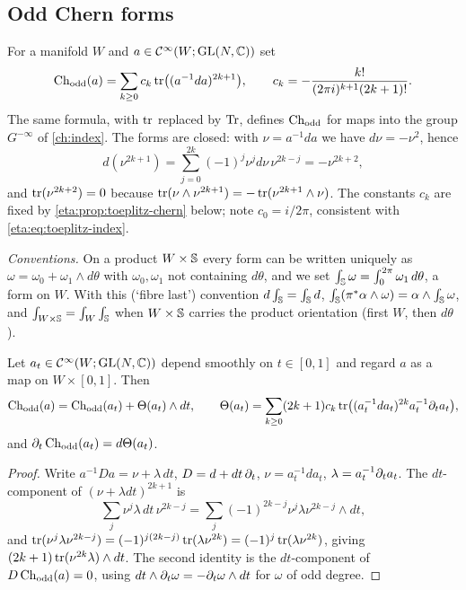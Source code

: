 \subsection{Odd Chern forms} For a manifold $W$ and $a\in\mathcal{C}^\infty(W;\operatorname{GL}(N,\mathbb{C}))$ set
\begin{equation}\label{eta:eq:chodd}
\operatorname{Ch}_{\mathrm{odd}}(a)=\sum_{k\ge0}c_k\operatorname{tr}\bigl((a^{-1}da)^{2k+1}\bigr),\qquad
c_k=-\frac{k!}{(2\pi i)^{k+1}(2k+1)!}.
\end{equation}
The same formula, with $\operatorname{tr}$ replaced by $\operatorname{Tr}$, defines $\operatorname{Ch}_{\mathrm{odd}}$ for maps into the
group $G^{-\infty}$ of \cref{ch:index}. The forms are closed: with
$\nu=a^{-1}da$ we have $d\nu=-\nu^2$, hence
\begin{equation}\label{eta:eq:d-power}
d(\nu^{2k+1})=\sum_{j=0}^{2k}(-1)^j\nu^jd\nu\,\nu^{2k-j}=-\nu^{2k+2},
\end{equation}
and $\operatorname{tr}(\nu^{2k+2})=0$ because $\operatorname{tr}(\nu\wedge\nu^{2k+1})=-\operatorname{tr}(\nu^{2k+1}\wedge\nu)$. The
constants $c_k$ are fixed by \cref{eta:prop:toeplitz-chern} below; note
$c_0=i/2\pi$, consistent with \eqref{eta:eq:toeplitz-index}.

\emph{Conventions.} On a product $W\times\mathbb{S}$ every form can be written uniquely as
$\omega=\omega_0+\omega_1\wedge d\theta$ with $\omega_0,\omega_1$ not containing
$d\theta$, and we set $\int_{\mathbb{S}}\omega=\int_0^{2\pi}\omega_1\,d\theta$, a form on
$W$. With this (`fibre last') convention $d\int_{\mathbb{S}}=\int_{\mathbb{S}} d$,
$\int_{\mathbb{S}}(\pi^*\alpha\wedge\omega)=\alpha\wedge\int_{\mathbb{S}}\omega$, and
$\int_{W\times\mathbb{S}}=\int_W\int_{\mathbb{S}}$ when $W\times\mathbb{S}$ carries the product
orientation (first $W$, then $d\theta$).

\begin{lemma}\label{eta:lem:transgression}
Let $a_t\in\mathcal{C}^\infty(W;\operatorname{GL}(N,\mathbb{C}))$ depend smoothly on $t\in[0,1]$ and regard $a$ as a map on
$W\times[0,1]$. Then
\[
\operatorname{Ch}_{\mathrm{odd}}(a)=\operatorname{Ch}_{\mathrm{odd}}(a_t)+\Theta(a_t)\wedge dt,\qquad
\Theta(a_t)=\sum_{k\ge0}(2k+1)c_k\operatorname{tr}\bigl((a_t^{-1}da_t)^{2k}a_t^{-1}\partial_ta_t\bigr),
\]
and $\partial_t\operatorname{Ch}_{\mathrm{odd}}(a_t)=d\Theta(a_t)$.
\end{lemma}

\begin{proof} Write $a^{-1}Da=\nu+\lambda\,dt$, $D=d+dt\,\partial_t$, $\nu=a_t^{-1}da_t$,
$\lambda=a_t^{-1}\partial_ta_t$. The $dt$-component of $(\nu+\lambda dt)^{2k+1}$ is
\[
\sum_j\nu^j\lambda\,dt\,\nu^{2k-j}=\sum_j(-1)^{2k-j}\nu^j\lambda\nu^{2k-j}\wedge dt,
\]
and $\operatorname{tr}(\nu^j\lambda\nu^{2k-j})=(-1)^{j(2k-j)}\operatorname{tr}(\lambda\nu^{2k})=(-1)^j\operatorname{tr}(\lambda\nu^{2k})$,
giving $(2k+1)\operatorname{tr}(\nu^{2k}\lambda)\wedge dt$. The second identity is the
$dt$-component of $D\operatorname{Ch}_{\mathrm{odd}}(a)=0$, using $dt\wedge\partial_t\omega=-\partial_t\omega\wedge dt$
for $\omega$ of odd degree.
\end{proof}

